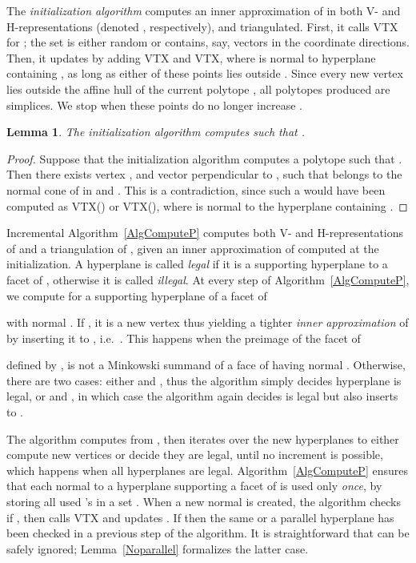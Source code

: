 \documentclass{article}
\newtheorem{lemma}{Lemma}
\begin{document}
The \textit{initialization algorithm}
computes an inner approximation of 
in both V- and H-representations (denoted , respectively),
and triangulated.
First, it calls {VTX} for
; the set  is either random or contains,
say, vectors in the  coordinate directions.
Then, it updates  by adding {VTX} and {VTX},
where  is normal to hyperplane  containing ,
as long as either of these points lies outside .
Since every new vertex lies outside the affine hull of the current 
polytope , all polytopes produced are simplices.
We stop when these points do no longer increase . 

\begin{lemma}\label{Linit}
The initialization algorithm computes 
such that .
\end{lemma}
\begin{proof}
Suppose that the initialization algorithm computes a polytope  
such that . Then there exists vertex
,  and vector
 perpendicular to ,
such that  belongs to the normal cone of 
in  and .
This is a contradiction, since such a  would have been computed
as VTX() or VTX(),
where  is normal to the hyperplane  containing .
\end{proof} 

Incremental Algorithm~\ref{AlgComputeP} computes both V- and
H-representa\-tions of  and a triangulation
of , given an inner approximation  of  computed at
the initialization.
A hyperplane  is called \emph{legal}
if it is a supporting hyperplane to a facet of ,
otherwise it is called \emph{illegal}.
At every step of Algorithm~\ref{AlgComputeP}, we compute
 for a supporting hyperplane  of a facet of

with normal .
If , it is a new vertex thus yielding a tighter \textit{inner
approximation} of  by inserting it to , i.e.\ . 
This happens when the preimage   of the facet  of
 
defined by , is not a Minkowski summand of a face of  having 
normal .
Otherwise, there are two cases: either  and , 
thus the algorithm simply decides hyperplane  is legal, or
 and , in which case the algorithm again
decides  is legal but also inserts  to .

The algorithm computes  from , then iterates over the
new hyperplanes to either compute new vertices or decide they are legal,
until no increment is possible, which happens when all hyperplanes
are legal. 
Algorithm~\ref{AlgComputeP} ensures that each normal  to a hyperplane
supporting a facet of  is used only \emph{once}, by storing all used 's in
a set .
When a new normal  is created, the algorithm checks if ,
then calls VTX and updates .
If  then the same or a parallel hyperplane has been
checked in a previous step of the algorithm.
It is straightforward that  can be safely ignored;
Lemma~\ref{Noparallel} formalizes the latter case.
\end{document}

